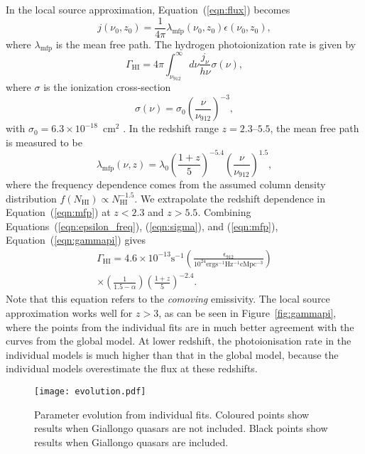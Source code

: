 \documentclass[a4paper,fleqn,usenatbib]{mnras}
\begin{document}
In the local source approximation, Equation~(\ref{eqn:flux}) becomes
\begin{equation}
  j(\nu_0, z_0) = \frac{1}{4\pi}\lambda_\mathrm{mfp}(\nu_0, z_0)\epsilon(\nu_0, z_0),
\end{equation}
where $\lambda_\mathrm{mfp}$ is the mean free path.  The hydrogen
photoionization rate is given by
\begin{equation}
  \Gamma_\mathrm{HI}=4\pi\int_{\nu_{912}}^\infty d\nu \frac{j_\nu}{h\nu} \sigma(\nu),
  \label{eqn:gammapi}
\end{equation}
where $\sigma$ is the ionization cross-section
\begin{equation}
  \sigma(\nu) = \sigma_0\left(\frac{\nu}{\nu_{912}}\right)^{-3},
  \label{eqn:sigma}
\end{equation}
with $\sigma_0=6.3\times 10^{-18}$~cm$^2$ \citep{2006agna.book.....O}.
In the redshift range $z=2.3$--$5.5$, the mean free path is measured
to be \citep{2014MNRAS.445.1745W}
\begin{equation}
  \lambda_\mathrm{mfp}(\nu, z)= \lambda_0\left(\frac{1+z}{5}\right)^{-5.4}\left(\frac{\nu}{\nu_{912}}\right)^{1.5},
  \label{eqn:mfp}
\end{equation}
where the frequency dependence comes from the assumed column density
distribution $f(N_\mathrm{HI})\propto N_\mathrm{HI}^{-1.5}$.  We
extrapolate the redshift dependence in Equation~(\ref{eqn:mfp}) at
$z<2.3$ and $z>5.5$.  Combining Equations~(\ref{eqn:epsilon_freq}),
(\ref{eqn:sigma}), and (\ref{eqn:mfp}), Equation~(\ref{eqn:gammapi})
gives
\begin{multline}
  \Gamma_\mathrm{HI}=4.6\times 10^{-13} \mathrm{s}^{-1} \left(\frac{\epsilon_{912}}{10^{24}\mathrm{erg s^{-1} Hz^{-1} cMpc^{-3}}}\right)\\
  \times\left(\frac{1}{1.5-\alpha}\right)\left(\frac{1+z}{5}\right)^{-2.4}.
\end{multline}
Note that this equation refers to the \emph{comoving} emissivity.  The
local source approximation works well for $z>3$, as can be seen in
Figure~\ref{fig:gammapi}, where the points from the individual fits
are in much better agreement with the curves from the global model.
At lower redshift, the photoionisation rate in the individual models
is much higher than that in the global model, because the individual
models overestimate the flux at these redshifts. 

\begin{figure*}
  \begin{center}
    \texttt{[image: evolution.pdf]}
  \end{center}
  \caption{Parameter evolution from individual fits.  Coloured points
    show results when Giallongo quasars are not included.  Black
    points show results when Giallongo quasars are included.}
\end{figure*}
\end{document}
